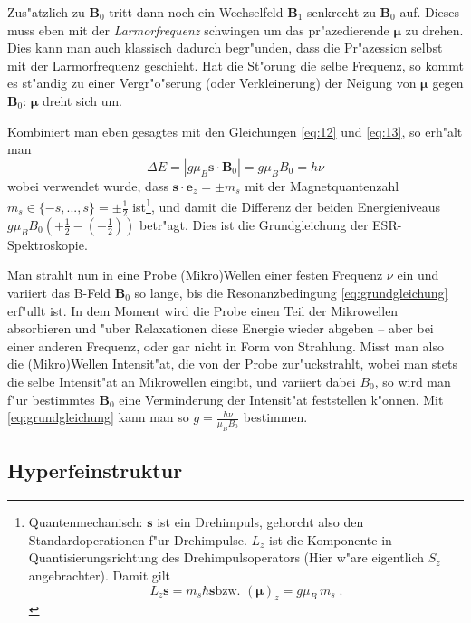 \documentclass[a4paper,12pt]{article}
\renewcommand{\vec}[1]{\ensuremath{\boldsymbol{#1}}}
\begin{document}
Zus"atzlich zu $\vec B_0$ tritt dann noch ein Wechselfeld $\vec B_1$
senkrecht zu $\vec B_0$ auf. Dieses muss eben mit der
\emph{Larmorfrequenz} schwingen um das pr"azedierende $\vec\mu$ zu
drehen. Dies kann man auch klassisch dadurch begr"unden, dass die
Pr"azession selbst mit der Larmorfrequenz geschieht. Hat die St"orung
die selbe Frequenz, so kommt es st"andig zu einer Vergr"o"serung (oder
Verkleinerung) der Neigung von $\vec\mu$ gegen $\vec B_0$: $\vec\mu$
dreht sich um.

Kombiniert man eben gesagtes mit den Gleichungen \eqref{eq:12} und
\eqref{eq:13}, so erh"alt man
\begin{equation}
  \label{eq:grundgleichung}
   \Delta E = | g \mu_B \vec s \cdot \vec B_0 | = \boxed{ g \mu_B B_0
     = h \nu } 
\end{equation}
wobei verwendet wurde, dass $\vec s \cdot \vec e_z = \pm m_s$ mit der
Magnetquantenzahl $m_s \in \{-s, ..., s\} = \pm \frac 1 2$
ist\footnote{\label{fn:spin-b-feld}Quantenmechanisch: $\vec s$ ist ein
  Drehimpuls, gehorcht also den Standardoperationen f"ur
  Drehimpulse. $L_z$ ist die Komponente in Quantisierungsrichtung des
  Drehimpulsoperators (Hier w"are eigentlich $S_z$
  angebrachter). Damit gilt $$L_z \vec s = m_s \hbar \vec s \text{
    bzw. } (\vec \mu)_z = g \mu_B \, m_s \; .$$}, und damit die
Differenz der beiden Energieniveaus $g\mu_BB_0( + \frac 1 2 - (- \frac
1 2 ) )$ betr"agt. Dies ist die Grundgleichung der ESR-Spektroskopie.

Man strahlt nun in eine Probe (Mikro)Wellen einer festen Frequenz
$\nu$ ein und variiert das B-Feld $\vec B_0$ so lange, bis die
Resonanzbedingung \eqref{eq:grundgleichung} erf"ullt ist. In dem
Moment wird die Probe einen Teil der Mikrowellen absorbieren und "uber
Relaxationen diese Energie wieder abgeben -- aber bei einer anderen
Frequenz, oder gar nicht in Form von Strahlung. Misst man also die
(Mikro)Wellen Intensit"at, die von der Probe zur"uckstrahlt, wobei man
stets die selbe Intensit"at an Mikrowellen eingibt, und variiert dabei
$B_0$, so wird man f"ur bestimmtes
 $\vec B_0$ eine Verminderung der
Intensit"at feststellen k"onnen. Mit \eqref{eq:grundgleichung} kann
man so $g = \frac{ h \nu }{ \mu_B B_0 }$ bestimmen.




\subsection{Hyperfeinstruktur}
\label{sec:hyperfeinstruktur}
\end{document}
